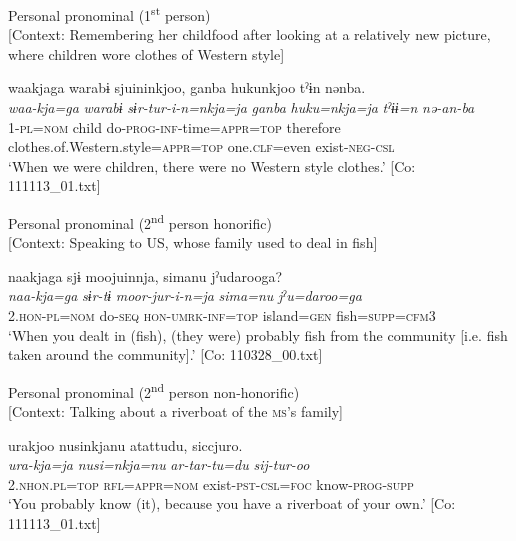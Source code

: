 \ea\label{ex:6-99}
 \ea Personal pronominal (1\textsuperscript{st} person)\\{}
[Context: Remembering her childfood after looking at a relatively new picture, where children wore clothes of Western style]

{\TM}
\glll waakjaga  warabɨ  sjuininkjoo,  ganba      hukunkjoo  tˀɨn  nənba.\\
      \textit{waa-kja=ga}  \textit{warabɨ}  \textit{sɨr-tur-i-n=nkja=ja}  \textit{ganba}      \textit{huku=nkja=ja}  \textit{tˀɨɨ=n}  \textit{nə-an-ba}\\
      1-\textsc{pl}=\textsc{nom}  child  do-\textsc{prog}-\textsc{inf}-time=\textsc{appr}=\textsc{top}  therefore      clothes.of.Western.style=\textsc{appr}=\textsc{top}  one.\textsc{clf}=even  exist-\textsc{neg}-\textsc{csl}\\
\glt ‘When we were children, there were no Western style clothes.’ [Co: 111113\_01.txt]

\ex Personal pronominal (2\textsuperscript{nd} person honorific)\\{}
[Context: Speaking to US, whose family used to deal in fish]

{\TM}
\glll naakjaga  sjɨ  moojuinnja,  simanu      jˀudarooga?\\
      \textit{naa-kja=ga}  \textit{sɨr-tɨ}  \textit{moor-jur-i-n=ja}  \textit{sima=nu}     \textit{jˀu=daroo=ga}\\
      2.\textsc{hon}-\textsc{pl}=\textsc{nom}  do-\textsc{seq}  \textsc{hon}-\textsc{umrk}-\textsc{inf}=\textsc{top}  island=\textsc{gen}      fish=\textsc{supp}=\textsc{cfm}3\\
\glt ‘When you dealt in (fish), (they were) probably fish from the community [i.e. fish taken around the community].’ [Co: 110328\_00.txt]

\ex Personal pronominal (2\textsuperscript{nd} person non-honorific)\\{}
[Context: Talking about a riverboat of the \textsc{ms}’s family]

{\TM}
\glll urakjoo  nusinkjanu  atattudu,  siccjuro.\\
      \textit{ura-kja=ja}  \textit{nusi=nkja=nu}  \textit{ar-tar-tu=du}  \textit{sij-tur-oo}\\
      2.\textsc{nhon}.\textsc{pl}=\textsc{top}  \textsc{rfl}=\textsc{appr}=\textsc{nom}  exist-\textsc{pst}-\textsc{csl}=\textsc{foc}      know-\textsc{prog}-\textsc{supp}\\
\glt ‘You probably know (it), because you have a riverboat of your own.’ [Co: 111113\_01.txt]
\z
\z



